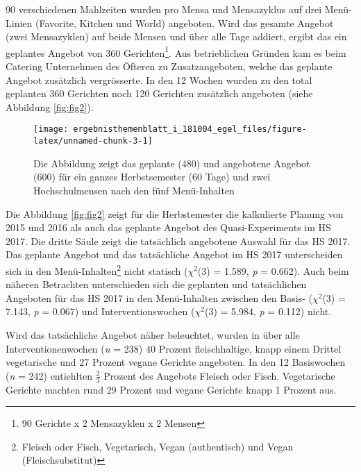 \documentclass[12pt,ngerman,]{article}
\let\rmarkdownfootnote\footnote%
\def\footnote{\protect\rmarkdownfootnote}
\begin{document}
\par

90 verschiedenen Mahlzeiten wurden pro Mensa und Mensazyklus auf drei
Menü-Linien (Favorite, Kitchen und World) angeboten. Wird das gesamte
Angebot (zwei Mensazyklen) auf beide Mensen und über alle Tage addiert,
ergibt das ein geplantes Angebot von 360 Gerichten\footnote{90 Gerichte
  x 2 Mensazyklen x 2 Mensen}. Aus betrieblichen Gründen kam es beim
Catering Unternehmen des Öfteren zu Zusatzangeboten, welche das geplante
Angebot zusätzlich vergrösserte. In den 12 Wochen wurden zu den total
geplanten 360 Gerichten noch 120 Gerichten zusätzlich angeboten (siehe
Abbildung \ref{fig:fig2}).

\begin{figure}[H]

{\centering \texttt{[image: ergebnisthemenblatt\_i\_181004\_egel\_files/figure-latex/unnamed-chunk-3-1]} 

}

\caption{\label{fig:fig2} Die Abbildung zeigt das geplante (480) und angebotene Angebot (600) für ein ganzes Herbstsemester (60 Tage) und zwei Hochschulmensen nach den fünf Menü-Inhalten}\label{fig:unnamed-chunk-3}
\end{figure}

Die Abbildung \ref{fig:fig2} zeigt für die Herbstemester die kalkulierte
Planung von 2015 und 2016 als auch das geplante Angebot des
Quasi-Experiments im HS 2017. Die dritte Säule zeigt die tatsächlich
angebotene Auswahl für das HS 2017. Das geplante Angebot und das
tatsächliche Angebot im HS 2017 unterscheiden sich in den
Menü-Inhalten\footnote{Fleisch oder Fisch, Vegetarisch, Vegan
  (authentisch) und Vegan (Fleischsubstitut)} nicht statisch
(\(\chi^2\)(3) = 1.589, \emph{p} = 0.662). Auch beim näheren Betrachten
unterschieden sich die geplanten und tatsächlichen Angeboten für das HS
2017 in den Menü-Inhalten zwischen den Basis- (\(\chi^2\)(3) = 7.143,
\emph{p} = 0.067) und Interventionswochen (\(\chi^2\)(3) = 5.984,
\emph{p} = 0.112) nicht.

\par

Wird das tatsächliche Angebot näher beleuchtet, wurden in über alle
Interventionenwochen (\emph{n} = 238) 40 Prozent fleischhaltige, knapp
einem Drittel vegetarische und 27 Prozent vegane Gerichte angeboten. In
den 12 Basiswochen (\emph{n} = 242) entiehlten \(\frac{2}{3}\) Prozent
des Angebots Fleisch oder Fisch. Vegetarische Gerichte machten rund 29
Prozent und vegane Gerichte knapp 1 Prozent aus.
\end{document}
